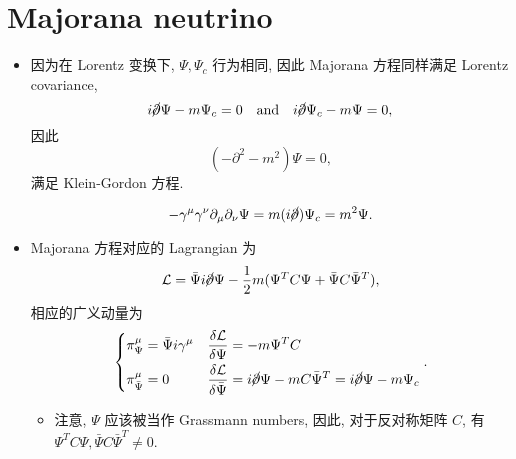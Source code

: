\section{Majorana neutrino}
\begin{itemize}
	\item 因为在 Lorentz 变换下, $\Psi, \Psi_c$ 行为相同, 因此 Majorana 方程同样满足 Lorentz covariance,
	\begin{equation}
		i \cancel{\partial} \Psi - m \Psi_c = 0 \quad \text{and} \quad i \cancel{\partial} \Psi_c - m \Psi = 0,
	\end{equation}
	因此
	\begin{equation}
		(- \partial^2 - m^2) \Psi = 0,
	\end{equation}
	满足 Klein-Gordon 方程.
	
	\begin{tcolorbox}[title=calculation:]
		\begin{equation}
			- \gamma^\mu \gamma^\nu \partial_\mu \partial_\nu \Psi = m (i \cancel{\partial}) \Psi_c = m^2 \Psi.
		\end{equation}
	\end{tcolorbox}
	
	\item Majorana 方程对应的 Lagrangian 为
	\begin{equation}
		\mathcal{L} = \bar{\Psi} i \cancel{\partial} \Psi - \frac{1}{2} m (\Psi^T C \Psi + \bar{\Psi} C \bar{\Psi}^T),
	\end{equation}
	相应的广义动量为
	\begin{equation}
		\begin{dcases}
			\pi_\Psi^\mu = \bar{\Psi} i \gamma^\mu & \frac{\delta \mathcal{L}}{\delta \Psi} = - m \Psi^T C \\
			\pi_{\bar{\Psi}}^\mu = 0 & \frac{\delta \mathcal{L}}{\delta \bar{\Psi}} = i \cancel{\partial} \Psi - m C \bar{\Psi}^T = i \cancel{\partial} \Psi - m \Psi_c
		\end{dcases}.
	\end{equation}
	\begin{itemize}
		\item 注意, $\Psi$ 应该被当作 Grassmann numbers, 因此, 对于反对称矩阵 $C$, 有 $\Psi^T C \Psi, \bar{\Psi} C \bar{\Psi}^T \neq 0$.
	\end{itemize}
	

\end{itemize}
